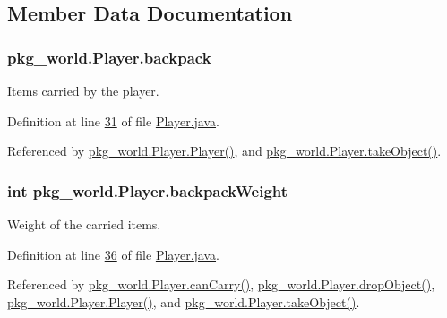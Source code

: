 \subsection{Member Data Documentation}
\hypertarget{classpkg__world_1_1Player_adea3925e7f823a9602e5f9ee58683e3b}{
\subsubsection[{backpack}]{ pkg\-\_\-world.\-Player.\-backpack\hspace{0.3cm}{\ttfamily [private]}}}\label{classpkg__world_1_1Player_adea3925e7f823a9602e5f9ee58683e3b}


Items carried by the player. 



Definition at line \hyperlink{Player_8java_source_l00031}{31} of file \hyperlink{Player_8java_source}{Player.\-java}.



Referenced by \hyperlink{Player_8java_source_l00063}{pkg\-\_\-world.\-Player.\-Player()}, and \hyperlink{Player_8java_source_l00196}{pkg\-\_\-world.\-Player.\-take\-Object()}.

\hypertarget{classpkg__world_1_1Player_a19ed9d4d1b17f409f106142ec2fd68a3}{
\subsubsection[{backpack\-Weight}]{\setlength{\rightskip}{0pt plus 5cm}int pkg\-\_\-world.\-Player.\-backpack\-Weight\hspace{0.3cm}{\ttfamily [private]}}}\label{classpkg__world_1_1Player_a19ed9d4d1b17f409f106142ec2fd68a3}


Weight of the carried items. 



Definition at line \hyperlink{Player_8java_source_l00036}{36} of file \hyperlink{Player_8java_source}{Player.\-java}.



Referenced by \hyperlink{Player_8java_source_l00188}{pkg\-\_\-world.\-Player.\-can\-Carry()}, \hyperlink{Player_8java_source_l00205}{pkg\-\_\-world.\-Player.\-drop\-Object()}, \hyperlink{Player_8java_source_l00063}{pkg\-\_\-world.\-Player.\-Player()}, and \hyperlink{Player_8java_source_l00196}{pkg\-\_\-world.\-Player.\-take\-Object()}.

